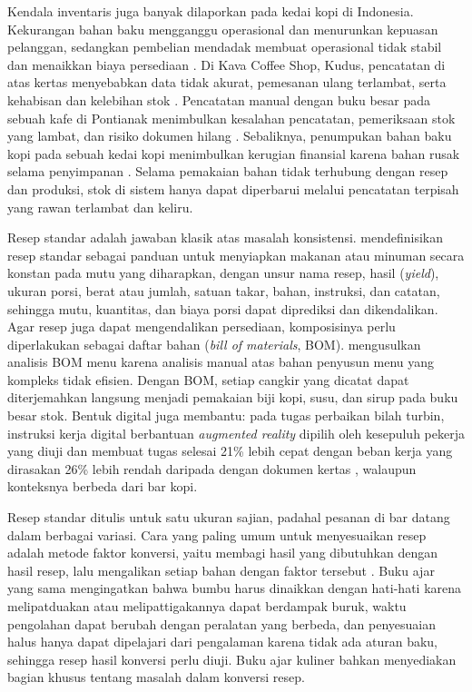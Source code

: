 Kendala inventaris juga banyak dilaporkan pada kedai kopi di Indonesia. Kekurangan bahan baku mengganggu operasional dan menurunkan kepuasan pelanggan, sedangkan pembelian mendadak membuat operasional tidak stabil dan menaikkan biaya persediaan \citep*{nurhalizapratiwi2025analisis}. Di Kava Coffee Shop, Kudus, pencatatan di atas kertas menyebabkan data tidak akurat, pemesanan ulang terlambat, serta kehabisan dan kelebihan stok \citep*{taufiq2025implementation}. Pencatatan manual dengan buku besar pada sebuah kafe di Pontianak menimbulkan kesalahan pencatatan, pemeriksaan stok yang lambat, dan risiko dokumen hilang \citep*{abdur2026sistem}. Sebaliknya, penumpukan bahan baku kopi pada sebuah kedai kopi menimbulkan kerugian finansial karena bahan rusak selama penyimpanan \citep*{nasution2025application}. Selama pemakaian bahan tidak terhubung dengan resep dan produksi, stok di sistem hanya dapat diperbarui melalui pencatatan terpisah yang rawan terlambat dan keliru.

Resep standar adalah jawaban klasik atas masalah konsistensi. \citet*{naumov2023employment} mendefinisikan resep standar sebagai panduan untuk menyiapkan makanan atau minuman secara konstan pada mutu yang diharapkan, dengan unsur nama resep, hasil (\textit{yield}), ukuran porsi, berat atau jumlah, satuan takar, bahan, instruksi, dan catatan, sehingga mutu, kuantitas, dan biaya porsi dapat diprediksi dan dikendalikan. Agar resep juga dapat mengendalikan persediaan, komposisinya perlu diperlakukan sebagai daftar bahan (\textit{bill of materials}, BOM). \citet{kamal2021bill} mengusulkan analisis BOM menu karena analisis manual atas bahan penyusun menu yang kompleks tidak efisien. Dengan BOM, setiap cangkir yang dicatat dapat diterjemahkan langsung menjadi pemakaian biji kopi, susu, dan sirup pada buku besar stok. Bentuk digital juga membantu: pada tugas perbaikan bilah turbin, instruksi kerja digital berbantuan \textit{augmented reality} dipilih oleh kesepuluh pekerja yang diuji dan membuat tugas selesai 21\% lebih cepat dengan beban kerja yang dirasakan 26\% lebih rendah daripada dengan dokumen kertas \citep*{eversberg2023evaluating}, walaupun konteksnya berbeda dari bar kopi.

Resep standar ditulis untuk satu ukuran sajian, padahal pesanan di bar datang dalam berbagai variasi. Cara yang paling umum untuk menyesuaikan resep adalah metode faktor konversi, yaitu membagi hasil yang dibutuhkan dengan hasil resep, lalu mengalikan setiap bahan dengan faktor tersebut \citep*{bccook2015basic}. Buku ajar yang sama mengingatkan bahwa bumbu harus dinaikkan dengan hati-hati karena melipatduakan atau melipattigakannya dapat berdampak buruk, waktu pengolahan dapat berubah dengan peralatan yang berbeda, dan penyesuaian halus hanya dapat dipelajari dari pengalaman karena tidak ada aturan baku, sehingga resep hasil konversi perlu diuji. Buku ajar kuliner \citet*{gisslen2025professional} bahkan menyediakan bagian khusus tentang masalah dalam konversi resep.

